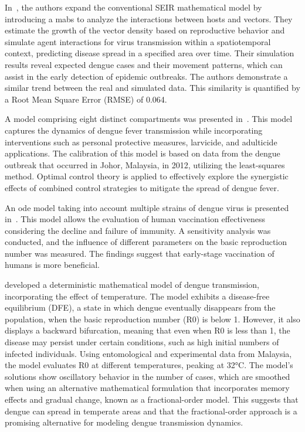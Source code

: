 In~\cite{Imran2020}, the authors expand the conventional SEIR mathematical model
by introducing a \gls{mabs} to analyze the interactions between hosts and
vectors. They estimate the growth of the vector density based on reproductive
behavior and simulate agent interactions for virus transmission within a
spatiotemporal context, predicting disease spread in a specified area over time.
Their simulation results reveal expected dengue cases and their movement
patterns, which can assist in the early detection of epidemic outbreaks. The
authors demonstrate a similar trend between the real and simulated data. This
similarity is quantified by a Root Mean Square Error (RMSE) of 0.064.

A model comprising eight distinct compartments was presented
in~\cite{Abidemi2020}. This model captures the dynamics of dengue fever
transmission while incorporating interventions such as personal protective
measures, larvicide, and adulticide applications. The calibration of this model
is based on data from the dengue outbreak that occurred in Johor, Malaysia, in
2012, utilizing the least-squares method. Optimal control theory is applied to
effectively explore the synergistic effects of combined control strategies to
mitigate the spread of dengue fever.

An \gls{ode} model taking into account multiple strains of dengue virus is
presented in~\cite{Xue2021}. This model allows the evaluation of human
vaccination effectiveness considering the decline and failure of immunity. A
sensitivity analysis was conducted, and the influence of different parameters on
the basic reproduction number was measured. The findings suggest that
early-stage vaccination of humans is more beneficial.

\cite{hamdan:2021} developed a deterministic mathematical model of dengue
transmission, incorporating the effect of temperature. The model exhibits a
disease-free equilibrium (DFE), a state in which dengue eventually disappears
from the population, when the basic reproduction number (R0) is below 1.
However, it also displays a backward bifurcation, meaning that even when R0 is
less than 1, the disease may persist under certain conditions, such as high
initial numbers of infected individuals. Using entomological and experimental
data from Malaysia, the model evaluates R0 at different temperatures, peaking at
32°C. The model's solutions show oscillatory behavior in the number of cases,
which are smoothed when using an alternative mathematical formulation that
incorporates memory effects and gradual change, known as a fractional-order
model. This suggests that dengue can spread in temperate areas and that the
fractional-order approach is a promising alternative for modeling dengue
transmission dynamics.


